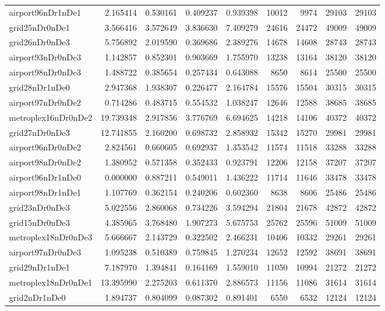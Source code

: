 \begin{longtable}{|l|r|r|r|r|r|r|r|r|}
airport96nDr1nDe1 & 2.165414 & 0.530161 & 0.409237 & 0.939398 & 10012 & 9974 & 29103 & 29103 \\
grid25nDr0nDe1 & 3.566416 & 3.572649 & 3.836630 & 7.409279 & 24616 & 24472 & 49009 & 49009 \\
grid26nDr0nDe3 & 5.756892 & 2.019590 & 0.369686 & 2.389276 & 14678 & 14608 & 28743 & 28743 \\
airport93nDr0nDe3 & 1.142857 & 0.852301 & 0.903669 & 1.755970 & 13238 & 13164 & 38120 & 38120 \\
airport98nDr0nDe3 & 1.488722 & 0.385654 & 0.257434 & 0.643088 & 8650 & 8614 & 25500 & 25500 \\
grid28nDr1nDe0 & 2.947368 & 1.938307 & 0.226477 & 2.164784 & 15576 & 15504 & 30315 & 30315 \\
airport97nDr0nDe2 & 0.714286 & 0.483715 & 0.554532 & 1.038247 & 12646 & 12588 & 38685 & 38685 \\
metroplex16nDr0nDe2 & 19.739348 & 2.917856 & 3.776769 & 6.694625 & 14218 & 14106 & 40372 & 40372 \\
grid27nDr0nDe3 & 12.741855 & 2.160200 & 0.698732 & 2.858932 & 15342 & 15270 & 29981 & 29981 \\
airport96nDr0nDe2 & 2.824561 & 0.660605 & 0.692937 & 1.353542 & 11574 & 11518 & 33288 & 33288 \\
airport98nDr0nDe2 & 1.380952 & 0.571358 & 0.352433 & 0.923791 & 12206 & 12158 & 37207 & 37207 \\
airport96nDr1nDe0 & 0.000000 & 0.887211 & 0.549011 & 1.436222 & 11714 & 11646 & 33478 & 33478 \\
airport98nDr1nDe1 & 1.107769 & 0.362154 & 0.240206 & 0.602360 & 8638 & 8606 & 25486 & 25486 \\
grid23nDr0nDe3 & 5.022556 & 2.860068 & 0.734226 & 3.594294 & 21804 & 21678 & 42872 & 42872 \\
grid15nDr0nDe3 & 4.385965 & 3.768480 & 1.907273 & 5.675753 & 25762 & 25596 & 51009 & 51009 \\
metroplex18nDr0nDe3 & 5.666667 & 2.143729 & 0.322502 & 2.466231 & 10406 & 10332 & 29261 & 29261 \\
airport97nDr0nDe3 & 1.095238 & 0.510389 & 0.759845 & 1.270234 & 12652 & 12592 & 38691 & 38691 \\
grid29nDr1nDe1 & 7.187970 & 1.394841 & 0.164169 & 1.559010 & 11050 & 10994 & 21272 & 21272 \\
metroplex18nDr0nDe1 & 13.395990 & 2.275203 & 0.611370 & 2.886573 & 11156 & 11086 & 31614 & 31614 \\
grid2nDr1nDe0 & 1.894737 & 0.804099 & 0.087302 & 0.891401 & 6550 & 6532 & 12124 & 12124 \\

\end{longtable}
